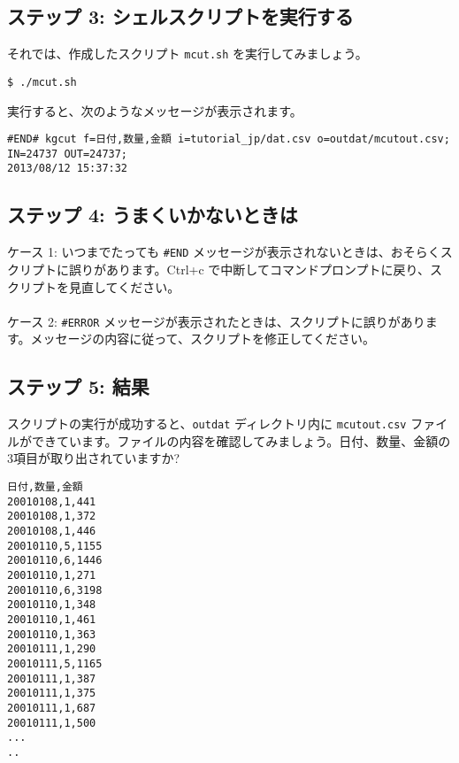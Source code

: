\subsection{ステップ 3: シェルスクリプトを実行する}

それでは、作成したスクリプト \verb|mcut.sh| を実行してみましょう。

\begin{verbatim}
$ ./mcut.sh
\end{verbatim} 

\noindent 実行すると、次のようなメッセージが表示されます。

\begin{verbatim}
#END# kgcut f=日付,数量,金額 i=tutorial_jp/dat.csv o=outdat/mcutout.csv; IN=24737 OUT=24737;
2013/08/12 15:37:32
\end{verbatim}

\subsection{ステップ 4: うまくいかないときは}

ケース 1: いつまでたっても \verb|#END| メッセージが表示されないときは、おそらくスクリプトに誤りがあります。Ctrl+c で中断してコマンドプロンプトに戻り、スクリプトを見直してください。\\
\\
ケース 2: \verb|#ERROR| メッセージが表示されたときは、スクリプトに誤りがあります。メッセージの内容に従って、スクリプトを修正してください。
\\
\subsection{ステップ 5: 結果 }

スクリプトの実行が成功すると、\verb|outdat| ディレクトリ内に \verb|mcutout.csv| ファイルができています。ファイルの内容を確認してみましょう。日付、数量、金額の3項目が取り出されていますか?


\begin{verbatim}
日付,数量,金額
20010108,1,441
20010108,1,372
20010108,1,446
20010110,5,1155
20010110,6,1446
20010110,1,271
20010110,6,3198
20010110,1,348
20010110,1,461
20010110,1,363
20010111,1,290
20010111,5,1165
20010111,1,387
20010111,1,375
20010111,1,687
20010111,1,500
...
..
\end{verbatim}

\vspace {5mm}


